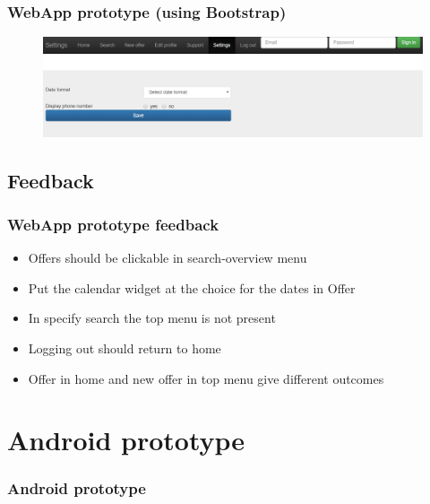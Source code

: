 \documentclass{beamer}
\begin{document}

\begin{frame}
\frametitle{WebApp prototype (using Bootstrap)}
\begin{figure}
\includegraphics[width=\textwidth]{png/webapp-settings.png}
\end{figure}
\end{frame}


\subsection{Feedback} %


\begin{frame}
\frametitle{WebApp prototype feedback}
\begin{itemize}
\item Offers should be clickable in search-overview menu
\item Put the calendar widget at the choice for the dates in Offer
\item In specify search the top menu is not present
\item Logging out should return to home
\item Offer in home and new offer in top menu give different outcomes
\end{itemize}
\end{frame}


\section{Android prototype}


\begin{frame}
\frametitle{Android prototype}
\end{frame}
\end{document}
